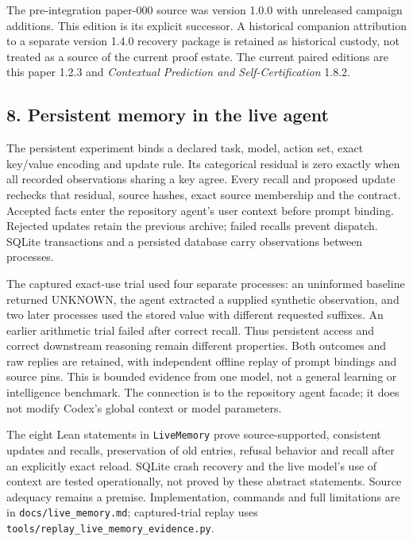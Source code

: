 \documentclass[
  10pt,
]{article}
\begin{document}
The pre-integration paper-000 source was version 1.0.0 with unreleased campaign additions. This edition is its explicit successor. A historical companion attribution to a separate version 1.4.0 recovery package is retained as historical custody, not treated as a source of the current proof estate. The current paired editions are this paper 1.2.3 and \emph{Contextual Prediction and Self-Certification} 1.8.2.

\subsection{8. Persistent memory in the live agent}\label{persistent-memory-in-the-live-agent}

The persistent experiment binds a declared task, model, action set, exact key/value encoding and update rule. Its categorical residual is zero exactly when all recorded observations sharing a key agree. Every recall and proposed update rechecks that residual, source hashes, exact source membership and the contract. Accepted facts enter the repository agent's user context before prompt binding. Rejected updates retain the previous archive; failed recalls prevent dispatch. SQLite transactions and a persisted database carry observations between processes.

The captured exact-use trial used four separate processes: an uninformed baseline returned UNKNOWN, the agent extracted a supplied synthetic observation, and two later processes used the stored value with different requested suffixes. An earlier arithmetic trial failed after correct recall. Thus persistent access and correct downstream reasoning remain different properties. Both outcomes and raw replies are retained, with independent offline replay of prompt bindings and source pins. This is bounded evidence from one model, not a general learning or intelligence benchmark. The connection is to the repository agent facade; it does not modify Codex's global context or model parameters.

The eight Lean statements in \texttt{LiveMemory} prove source-supported, consistent updates and recalls, preservation of old entries, refusal behavior and recall after an explicitly exact reload. SQLite crash recovery and the live model's use of context are tested operationally, not proved by these abstract statements. Source adequacy remains a premise. Implementation, commands and full limitations are in \texttt{docs/live\_memory.md}; captured-trial replay uses \texttt{tools/replay\_live\_memory\_evidence.py}.
\end{document}
